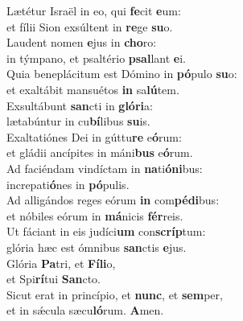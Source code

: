 \evenverse Lætétur Israël in eo, qui \textbf{fe}cit \textbf{e}um:~\*\\
\evenverse et fílii Sion exsúltent in \textbf{re}ge \textbf{su}o.\\
\oddverse Laudent nomen \textbf{e}jus in \textbf{cho}ro:~\*\\
\oddverse in týmpano, et psaltério \textbf{psal}lant \textbf{e}i.\\
\evenverse Quia beneplácitum est Dómino in \textbf{pó}pulo \textbf{su}o:~\*\\
\evenverse et exaltábit mansuétos \textbf{in} sa\textbf{lú}tem.\\
\oddverse Exsultábunt \textbf{san}cti in \textbf{gló}\textbf{ri}a:~\*\\
\oddverse lætabúntur in cu\textbf{bí}libus \textbf{su}is.\\
\evenverse Exaltatiónes Dei in gúttu\textbf{re} e\textbf{ó}rum:~\*\\
\evenverse et gládii ancípites in máni\textbf{bus} e\textbf{ó}rum.\\
\oddverse Ad faciéndam vindíctam in \textbf{na}ti\textbf{ó}\textbf{ni}bus:~\*\\
\oddverse increpati\textbf{ó}nes in \textbf{pó}pulis.\\
\evenverse Ad alligándos reges eórum \textbf{in} com\textbf{pé}\textbf{di}bus:~\*\\
\evenverse et nóbiles eórum in \textbf{má}nicis \textbf{fér}reis.\\
\oddverse Ut fáciant in eis judíci\textbf{um} con\textbf{scríp}tum:~\*\\
\oddverse glória hæc est ómnibus \textbf{san}ctis \textbf{e}jus.\\
\evenverse Glória \textbf{Pa}tri, et \textbf{Fí}\textbf{li}o,~\*\\
\evenverse et Spi\textbf{rí}tui \textbf{San}cto.\\
\oddverse Sicut erat in princípio, et \textbf{nunc}, et \textbf{sem}per,~\*\\
\oddverse et in sǽcula sæcu\textbf{ló}rum. \textbf{A}men.\\
